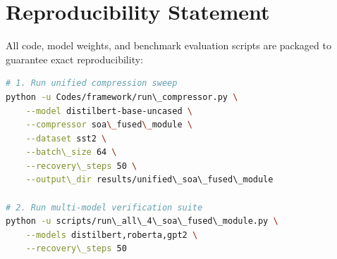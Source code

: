 \section{Reproducibility Statement}
All code, model weights, and benchmark evaluation scripts are packaged to guarantee exact reproducibility:
\begin{lstlisting}[language=bash]
# 1. Run unified compression sweep
python -u Codes/framework/run\_compressor.py \
    --model distilbert-base-uncased \
    --compressor soa\_fused\_module \
    --dataset sst2 \
    --batch\_size 64 \
    --recovery\_steps 50 \
    --output\_dir results/unified\_soa\_fused\_module

# 2. Run multi-model verification suite
python -u scripts/run\_all\_4\_soa\_fused\_module.py \
    --models distilbert,roberta,gpt2 \
    --recovery\_steps 50
\end{lstlisting}
